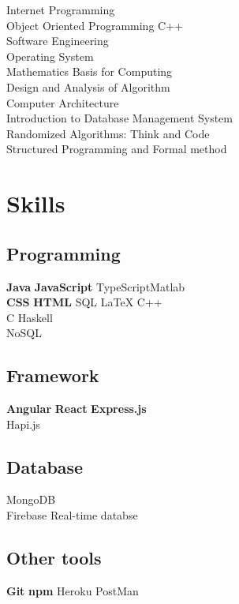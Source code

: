 \documentclass[letterpaper]{deedy-resume} %
\begin{document}
\begin{minipage}[t]{0.33\textwidth}
Internet Programming\\
Object Oriented Programming C++\\
Software Engineering\\
Operating System\\
Mathematics Basis for Computing\\
Design and Analysis of Algorithm\\
Computer Architecture\\
Introduction to Database Management System\\
Randomized Algorithms: Think and Code\\
Structured Programming and Formal method\\




\sectionspace %


\section{Skills}

\subsection{Programming}

\textbf{Java} \textbullet{} \textbf{JavaScript} \textbullet{} TypeScript\textbullet{}Matlab \\ 
\textbf{CSS} \textbullet{} \textbf{HTML} \textbullet{} SQL \textbullet{} \LaTeX \textbullet{} C++
\\C  \textbullet{} Haskell\\
NoSQL 
\subsection{Framework}
\textbf{Angular} \textbullet{} \textbf{React} \textbullet{} \textbf{Express.js} \\ Hapi.js
\subsection{Database}
MongoDB \\ Firebase Real-time databse
\subsection{Other tools}
\textbf{Git} \textbullet{} \textbf{npm} \textbullet{} Heroku \textbullet{} PostMan

\sectionspace %


\end{minipage} %
\end{document}
